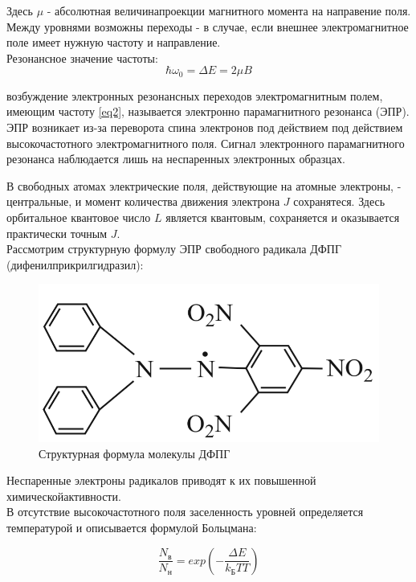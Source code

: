 \documentclass[a4paper]{article}
\begin{document}
Здесь $\mu$ - абсолютная величинапроекции магнитного момента на направение поля.
Между уровнями возможны переходы - в случае, если внешнее электромагнитное поле имеет нужную частоту и направление.\\

Резонансное значение частоты:
\begin{equation}
    \hbar \omega_0 = \varDelta E = 2\mu B \label{eq2}
\end{equation}

возбуждение электронных резонансных переходов электромагнитным полем, имеющим частоту \ref{eq2}, называется электронно парамагнитного резонанса (ЭПР).
ЭПР возникает из-за переворота спина электронов под действием под действием высокочастотного электромагнитного поля.  Сигнал электронного парамагнитного резонанса наблюдается лишь на неспаренных электронных образцах.

В свободных атомах электрические поля, действующие на атомные электроны, - центральные, и момент количества движения электрона $J$ сохранятеся. Здесь орбитальное квантовое число $L$ является квантовым, сохраняется и оказывается практически точным $J$. \\

Рассмотрим структурную формулу ЭПР свободного радикала ДФПГ (дифенилприкрилгидразил):

\begin{figure}
    \includegraphics[scale = 0.2]{pic1.png}
    \caption{Структурная формула молекулы ДФПГ}
    \label{pic1}
\end{figure}

Неспаренные электроны радикалов приводят к их повышенной химическойактивности. \\
В отсутствие высокочастотного поля заселенность уровней определяется температурой и описывается формулой Больцмана:

\begin{equation}
    \frac{N_в}{N_н} = exp(-\frac{\varDelta E}{k_БTT}) \label{eq3}
\end{equation}
\end{document}
